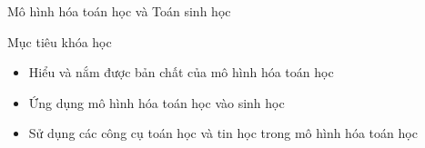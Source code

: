 \documentclass[pdf,aspectratio=169]{beamer}
\begin{document}
\begin{frame}{Mô hình hóa toán học và Toán sinh học}
\begin{center}
    \end{center}

\end{frame}

\begin{frame}{Mục tiêu khóa học}
    \begin{itemize}
        \item Hiểu và nắm được bản chất của mô hình hóa toán học
        \item Ứng dụng mô hình hóa toán học vào sinh học
        \item Sử dụng các công cụ toán học và tin học trong mô hình hóa toán học
    \end{itemize}
\end{frame}
\end{document}
